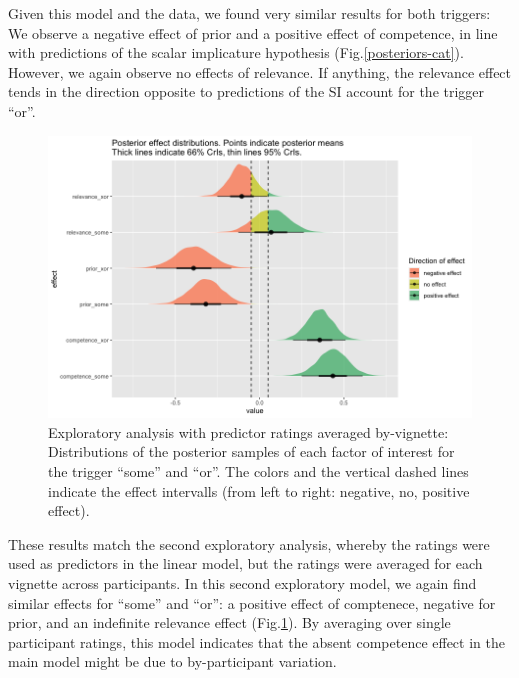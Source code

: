 \documentclass{sp}
\begin{document}
Given this model and the data, we found very similar results for both triggers: We observe a negative effect of prior and a positive effect of competence, in line with predictions of the scalar implicature hypothesis (Fig.\ref{posteriors-cat}). However, we again observe no effects of relevance. If anything, the relevance effect tends in the direction opposite to predictions of the SI account for the trigger ``or''. 
\begin{figure}[t]
	\begin{center}
		\includegraphics[width=1\linewidth]{images/posterior-effects-means.png}
	\end{center}
	\vspace{-0.3cm}
	\caption{Exploratory analysis with predictor ratings averaged by-vignette: Distributions of the posterior samples of each factor of interest for the trigger ``some'' and ``or''. The colors and the vertical dashed lines indicate the effect intervalls (from left to right: negative, no, positive effect).}
	\label{posteriors-mean}
\end{figure}

These results match the second exploratory analysis, whereby the ratings were used as predictors in the linear model, but the ratings were averaged for each vignette across participants. In this second  exploratory model, we again find similar effects for ``some'' and ``or'': a positive effect of comptenece, negative for prior, and an indefinite relevance effect (Fig.\ref{posteriors-mean}). By averaging over single participant ratings, this model indicates that the absent competence effect in the main model might be due to by-participant variation. 
\end{document}
